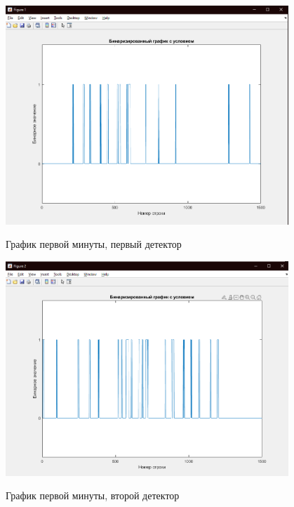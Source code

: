 \documentclass[a4paper,12pt]{article}
\begin{document}
\begin{center}
\includegraphics[width=0.8\textwidth]{images/binary/binary_first_1.png}
\end{center}
\begin{center}
График первой минуты, первый детектор
\end{center}

\begin{center}
\includegraphics[width=0.8\textwidth]{images/binary/binary_first_2.png}
\end{center}
\begin{center}
График первой минуты, второй детектор
\end{center}
\end{document}
